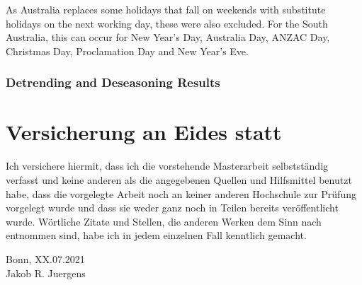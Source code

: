 \documentclass[12pt, a4paper]{article}
\theoremstyle{MAstyle} \newtheorem{assumption}{Assumption}[section]
\theoremstyle{MAstyle} \newtheorem{definition}{Definition}[section]
\theoremstyle{MAstyle} \newtheorem{theorem}{Theorem}[section]
\begin{document}
			As Australia replaces some holidays that fall on weekends with substitute holidays on the next working day, these were also excluded. For the South Australia, this can occur for New Year's Day, Australia Day, ANZAC Day, Christmas Day, Proclamation Day and New Year's Eve.
		
			\subsubsection{Detrending and Deseasoning Results}
			
			
			
	\newpage
	\thispagestyle{empty}
	\section*{Versicherung an Eides statt}	
	
		\vspace{3cm}
		
		Ich versichere hiermit, dass ich die vorstehende Masterarbeit
		selbstständig verfasst und keine anderen als die angegebenen Quellen
		und Hilfsmittel benutzt habe, dass die vorgelegte Arbeit noch an keiner
		anderen Hochschule zur Prüfung vorgelegt wurde und dass sie weder
		ganz noch in Teilen bereits veröffentlicht wurde. Wörtliche Zitate und
		Stellen, die anderen Werken dem Sinn nach entnommen sind, habe ich
		in jedem einzelnen Fall kenntlich gemacht.
		
		\vspace{2cm}
		Bonn, XX.07.2021 \hrulefill \\
		\hspace*{0mm}Jakob R. Juergens
		
		\vspace{\fill}
\end{document}
